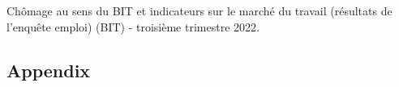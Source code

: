 \documentclass[12pt]{article}  %
\begin{document}
\newpage
\begin{thebibliography}{100}

Chômage au sens du {BIT} et indicateurs sur le marché du travail (résultats
  de l’enquête emploi) ({BIT}) - troisième trimestre 2022.
\end{thebibliography}



\begin{subappendices}  %
\section{Appendix}


\end{subappendices}  %
\end{document}
